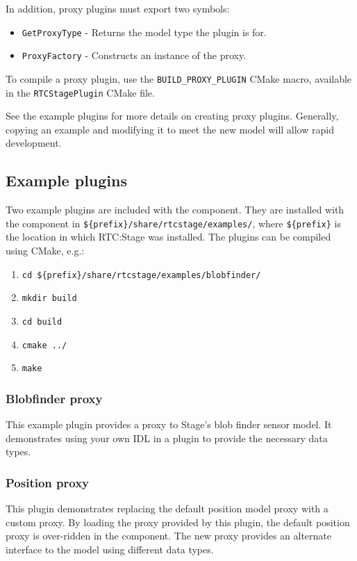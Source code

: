 \documentclass[a4paper,10pt]{article}
\begin{document}
In addition, proxy plugins must export two symbols:
\begin{itemize}
  \item \verb|GetProxyType| - Returns the model type the plugin is for.
  \item \verb|ProxyFactory| - Constructs an instance of the proxy.
\end{itemize}

To compile a proxy plugin, use the \verb|BUILD_PROXY_PLUGIN| CMake macro,
available in the \verb|RTCStagePlugin| CMake file.

See the example plugins for more details on creating proxy plugins. Generally,
copying an example and modifying it to meet the new model will allow rapid
development.

\subsection{Example plugins}
\label{sec1:example-plugins}

Two example plugins are included with the component. They are installed with
the component in \verb|${prefix}/share/rtcstage/examples/|, where
\verb|${prefix}| is the location in which RTC:Stage was installed. The plugins
can be compiled using CMake, e.g.:

\begin{enumerate}
  \item \verb|cd ${prefix}/share/rtcstage/examples/blobfinder/|
  \item \verb|mkdir build|
  \item \verb|cd build|
  \item \verb|cmake ../|
  \item \verb|make|
\end{enumerate}

\subsubsection{Blobfinder proxy}
\label{sec2:blobfinder-proxy}

This example plugin provides a proxy to Stage's blob finder sensor model. It
demonstrates using your own IDL in a plugin to provide the necessary data
types.

\subsubsection{Position proxy}
\label{sec2:position-proxy}

This plugin demonstrates replacing the default position model proxy with a
custom proxy. By loading the proxy provided by this plugin, the default
position proxy is over-ridden in the component. The new proxy provides an
alternate interface to the model using different data types.

\end{document}
